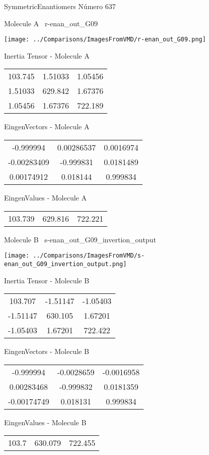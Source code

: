 \vtab[-3cm]
\begin{center}
{\large SymmetricEnantiomers \tab Número 637}
\end{center}
\begin{multicols}{2}
\begin{center}

Molecule A \
r-enan\_out\_G09

\texttt{[image: ../Comparisons/ImagesFromVMD/r-enan\_out\_G09.png]}

Inertia Tensor - Molecule A \\
\begin{tabular}{|c c c|}
103.745	 & 	1.51033	 & 	1.05456	 \\
1.51033	 & 	629.842	 & 	1.67376	 \\
1.05456	 & 	1.67376	 & 	722.189
\end{tabular}

\vtab
 EingenVectors - Molecule A     \\
\begin{tabular}{|c c c|}
-0.999994	 & 	0.00286537	 & 	0.0016974	 \\
-0.00283409	 & 	-0.999831	 & 	0.0181489	 \\
0.00174912	 & 	0.018144	 & 	0.999834
\end{tabular}

\vtab
 EingenValues - Molecule A     \\
\begin{tabular}{|c c c|}
103.739	 & 	629.816	 & 	722.221	 \\
\end{tabular}
\columnbreak

Molecule B \
s-enan\_out\_G09\_invertion\_output

\texttt{[image: ../Comparisons/ImagesFromVMD/s-enan\_out\_G09\_invertion\_output.png]}

Inertia Tensor - Molecule B \\
\begin{tabular}{|c c c|}
103.707	 & 	-1.51147	 & 	-1.05403	 \\
-1.51147	 & 	630.105	 & 	1.67201	 \\
-1.05403	 & 	1.67201	 & 	722.422
\end{tabular}

\vtab
 EingenVectors - Molecule B     \\
\begin{tabular}{|c c c|}
-0.999994	 & 	-0.0028659	 & 	-0.0016958	 \\
0.00283468	 & 	-0.999832	 & 	0.0181359	 \\
-0.00174749	 & 	0.018131	 & 	0.999834
\end{tabular}

\vtab
 EingenValues - Molecule B     \\
\begin{tabular}{|c c c|}
103.7	 & 	630.079	 & 	722.455	 \\
\end{tabular}

\end{center}
\end{multicols}

